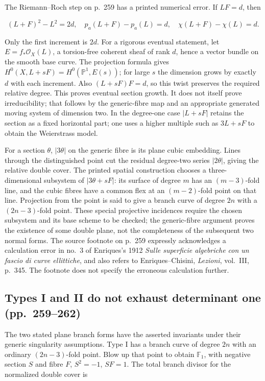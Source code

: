 The Riemann--Roch step on p.~259 has a printed numerical error. If \(L F=d\), then

\[
(L+F)^2-L^2=2d,\quad
p_a(L+F)-p_a(L)=d,\quad
\chi(L+F)-\chi(L)=d.
\]

Only the first increment is \(2d\). For a rigorous eventual statement, let \(E=f_*\mathcal O_X(L)\), a torsion-free coherent sheaf of rank \(d\), hence a vector bundle on the smooth base curve. The projection formula gives \(H^0(X,L+sF)=H^0(\mathbb P^1,E(s))\); for large \(s\) the dimension grows by exactly \(d\) with each increment. Also \((L+sF)F=d\), so this twist preserves the required relative degree. This proves eventual section growth. It does not itself prove irreducibility; that follows by the generic-fibre map and an appropriate generated moving system of dimension two. In the degree-one case \(\vert L+sF\vert \) retains the section as a fixed horizontal part; one uses a higher multiple such as \(3L+sF\) to obtain the Weierstrass model.

For a section \(\theta\), \(\vert3\theta\vert\) on the generic fibre is its plane cubic embedding. Lines through the distinguished point cut the residual degree-two series \(\vert2\theta\vert\), giving the relative double cover. The printed spatial construction chooses a three-dimensional subsystem of \(\vert3\theta+sF\vert\): its surface of degree \(m\) has an \((m-3)\)-fold line, and the cubic fibres have a common flex at an \((m-2)\)-fold point on that line. Projection from the point is said to give a branch curve of degree \(2n\) with a \((2n-3)\)-fold point. These special projective incidences require the chosen subsystem and its base scheme to be checked; the generic-fibre argument proves the existence of some double plane, not the completeness of the subsequent two normal forms. The source footnote on p.~259 expressly acknowledges a calculation error in no.~3 of Enriques's 1912 \emph{Sulle superficie algebriche con un fascio di curve ellittiche}, and also refers to Enriques--Chisini, \emph{Lezioni}, vol.~III, p.~345. The footnote does not specify the erroneous calculation further.

\subsection{Types I and II do not exhaust determinant one (pp.~259--262)}\label{cp2-vii-4-2}

The two stated plane branch forms have the asserted invariants under their generic singularity assumptions. Type I has a branch curve of degree \(2n\) with an ordinary \((2n-3)\)-fold point. Blow up that point to obtain \(\mathbb F_1\), with negative section \(S\) and fibre \(F\), \(S^2=-1\), \(SF=1\). The total branch divisor for the normalized double cover is

